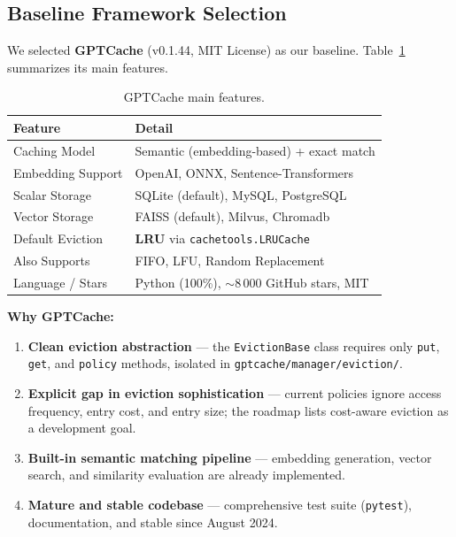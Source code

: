 \documentclass[11pt,a4paper]{article}
\begin{document}
\subsection{Baseline Framework Selection}

We selected \textbf{GPTCache} (v0.1.44, MIT License) as our baseline. Table~\ref{tab:features} summarizes its main features.

\begin{table}[H]
\centering
\caption{GPTCache main features.}
\label{tab:features}
\small
\begin{tabular}{@{} l l @{}}
\toprule
\textbf{Feature} & \textbf{Detail} \\
\midrule
Caching Model       & Semantic (embedding-based) + exact match \\
Embedding Support   & OpenAI, ONNX, Sentence-Transformers \\
Scalar Storage      & SQLite (default), MySQL, PostgreSQL \\
Vector Storage      & FAISS (default), Milvus, Chromadb \\
Default Eviction    & \textbf{LRU} via \texttt{cachetools.LRUCache} \\
Also Supports       & FIFO, LFU, Random Replacement \\
Language / Stars    & Python (100\%), $\sim$8\,000 GitHub stars, MIT \\
\bottomrule
\end{tabular}
\end{table}

\textbf{Why GPTCache:}
\begin{enumerate}[nosep]
  \item \textbf{Clean eviction abstraction} --- the \texttt{EvictionBase} class requires only \texttt{put}, \texttt{get}, and \texttt{policy} methods, isolated in \texttt{gptcache/manager/eviction/}.
  \item \textbf{Explicit gap in eviction sophistication} --- current policies ignore access frequency, entry cost, and entry size; the roadmap lists cost-aware eviction as a development goal.
  \item \textbf{Built-in semantic matching pipeline} --- embedding generation, vector search, and similarity evaluation are already implemented.
  \item \textbf{Mature and stable codebase} --- comprehensive test suite (\texttt{pytest}), documentation, and stable since August 2024.
\end{enumerate}
\end{document}
